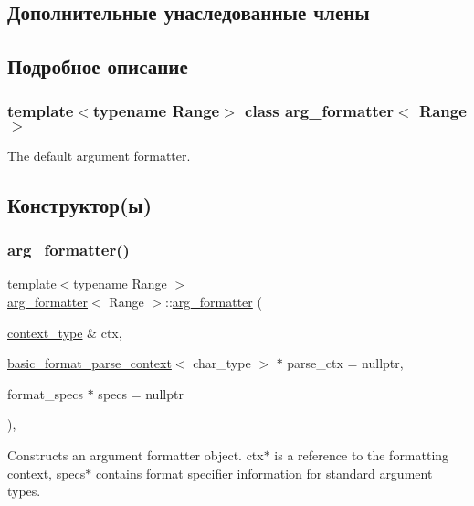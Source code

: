 \subsection*{Дополнительные унаследованные члены}


\subsection{Подробное описание}
\subsubsection*{template$<$typename Range$>$\newline
class arg\+\_\+formatter$<$ Range $>$}

The default argument formatter. 

\subsection{Конструктор(ы)}
\mbox{\label{classarg__formatter_ad30be490bff49291d06048448b004331}} 
\subsubsection{\texorpdfstring{arg\+\_\+formatter()}{arg\_formatter()}}
{\footnotesize\ttfamily template$<$typename Range $>$ \\
\hyperlink{classarg__formatter}{arg\+\_\+formatter}$<$ Range $>$\+::\hyperlink{classarg__formatter}{arg\+\_\+formatter} (\begin{DoxyParamCaption}\item[{\hyperlink{classbasic__format__context}{context\+\_\+type} \&}]{ctx,  }\item[{\hyperlink{classbasic__format__parse__context}{basic\+\_\+format\+\_\+parse\+\_\+context}$<$ char\+\_\+type $>$ $\ast$}]{parse\+\_\+ctx = {\ttfamily nullptr},  }\item[{format\+\_\+specs $\ast$}]{specs = {\ttfamily nullptr} }\end{DoxyParamCaption})\hspace{0.3cm}{\ttfamily [inline]}, {\ttfamily [explicit]}}

Constructs an argument formatter object. ctx$\ast$ is a reference to the formatting context, specs$\ast$ contains format specifier information for standard argument types.  

